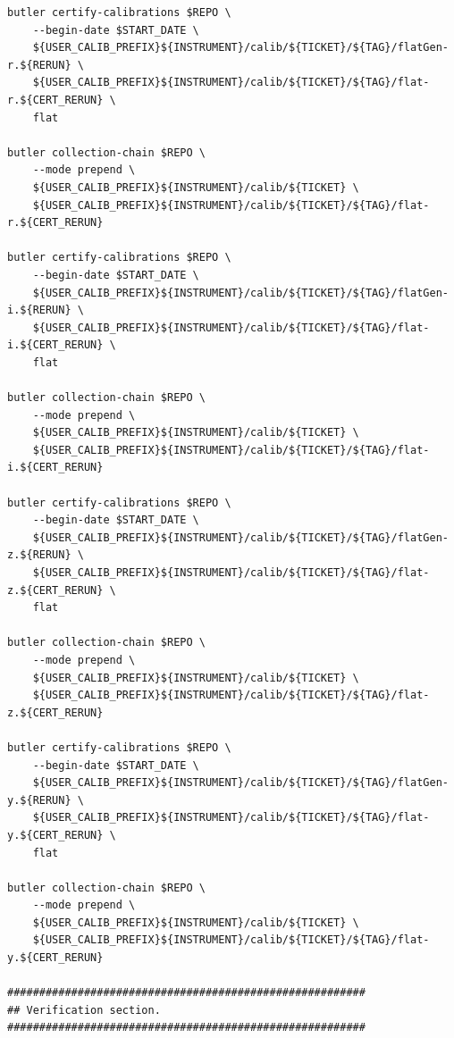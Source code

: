 \documentclass[DM,authoryear,toc]{lsstdoc}
\begin{document}
\begin{verbatim}
butler certify-calibrations $REPO \
    --begin-date $START_DATE \
    ${USER_CALIB_PREFIX}${INSTRUMENT}/calib/${TICKET}/${TAG}/flatGen-r.${RERUN} \
    ${USER_CALIB_PREFIX}${INSTRUMENT}/calib/${TICKET}/${TAG}/flat-r.${CERT_RERUN} \
    flat

butler collection-chain $REPO \
    --mode prepend \
    ${USER_CALIB_PREFIX}${INSTRUMENT}/calib/${TICKET} \
    ${USER_CALIB_PREFIX}${INSTRUMENT}/calib/${TICKET}/${TAG}/flat-r.${CERT_RERUN}

butler certify-calibrations $REPO \
    --begin-date $START_DATE \
    ${USER_CALIB_PREFIX}${INSTRUMENT}/calib/${TICKET}/${TAG}/flatGen-i.${RERUN} \
    ${USER_CALIB_PREFIX}${INSTRUMENT}/calib/${TICKET}/${TAG}/flat-i.${CERT_RERUN} \
    flat

butler collection-chain $REPO \
    --mode prepend \
    ${USER_CALIB_PREFIX}${INSTRUMENT}/calib/${TICKET} \
    ${USER_CALIB_PREFIX}${INSTRUMENT}/calib/${TICKET}/${TAG}/flat-i.${CERT_RERUN}

butler certify-calibrations $REPO \
    --begin-date $START_DATE \
    ${USER_CALIB_PREFIX}${INSTRUMENT}/calib/${TICKET}/${TAG}/flatGen-z.${RERUN} \
    ${USER_CALIB_PREFIX}${INSTRUMENT}/calib/${TICKET}/${TAG}/flat-z.${CERT_RERUN} \
    flat

butler collection-chain $REPO \
    --mode prepend \
    ${USER_CALIB_PREFIX}${INSTRUMENT}/calib/${TICKET} \
    ${USER_CALIB_PREFIX}${INSTRUMENT}/calib/${TICKET}/${TAG}/flat-z.${CERT_RERUN}

butler certify-calibrations $REPO \
    --begin-date $START_DATE \
    ${USER_CALIB_PREFIX}${INSTRUMENT}/calib/${TICKET}/${TAG}/flatGen-y.${RERUN} \
    ${USER_CALIB_PREFIX}${INSTRUMENT}/calib/${TICKET}/${TAG}/flat-y.${CERT_RERUN} \
    flat

butler collection-chain $REPO \
    --mode prepend \
    ${USER_CALIB_PREFIX}${INSTRUMENT}/calib/${TICKET} \
    ${USER_CALIB_PREFIX}${INSTRUMENT}/calib/${TICKET}/${TAG}/flat-y.${CERT_RERUN}

########################################################
## Verification section.
########################################################


\end{verbatim}
\end{document}
